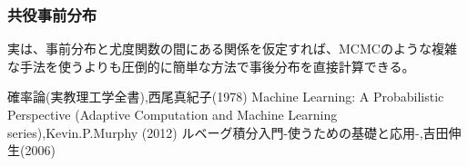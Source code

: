 \documentclass[dvipdfmx, a4paper]{jsarticle}
\begin{document}
\subsubsection{共役事前分布}
実は、事前分布と尤度関数の間にある関係を仮定すれば、MCMCのような複雑な手法を使うよりも圧倒的に簡単な方法で事後分布を直接計算できる。

\newpage
\begin{thebibliography}{99}
   確率論(実教理工学全書),西尾真紀子(1978)
   Machine Learning: A Probabilistic Perspective (Adaptive Computation and Machine Learning series),Kevin.P.Murphy (2012)
   ルベーグ積分入門-使うための基礎と応用-,吉田伸生(2006)
\end{thebibliography}
\end{document}
